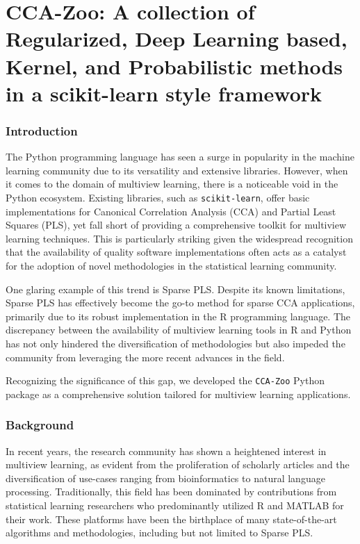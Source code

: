 \chapter{CCA-Zoo: A collection of Regularized, Deep Learning based, Kernel, and Probabilistic methods in a scikit-learn style framework}\label{sec:ccazoo}

\subsection{Introduction}

The Python programming language has seen a surge in popularity in the machine learning community due to its versatility and extensive libraries. However, when it comes to the domain of multiview learning, there is a noticeable void in the Python ecosystem. Existing libraries, such as \texttt{scikit-learn}\cite{pedregosa2011scikit}, offer basic implementations for Canonical Correlation Analysis (CCA) and Partial Least Squares (PLS), yet fall short of providing a comprehensive toolkit for multiview learning techniques. This is particularly striking given the widespread recognition that the availability of quality software implementations often acts as a catalyst for the adoption of novel methodologies in the statistical learning community.

One glaring example of this trend is Sparse PLS. Despite its known limitations, Sparse PLS has effectively become the go-to method for sparse CCA applications, primarily due to its robust implementation in the R programming language. The discrepancy between the availability of multiview learning tools in R and Python has not only hindered the diversification of methodologies but also impeded the community from leveraging the more recent advances in the field.

Recognizing the significance of this gap, we developed the \texttt{CCA-Zoo} Python package as a comprehensive solution tailored for multiview learning applications.

\subsection{Background}

In recent years, the research community has shown a heightened interest in multiview learning, as evident from the proliferation of scholarly articles and the diversification of use-cases ranging from bioinformatics to natural language processing.
Traditionally, this field has been dominated by contributions from statistical learning researchers who predominantly utilized R and MATLAB for their work.
These platforms have been the birthplace of many state-of-the-art algorithms and methodologies, including but not limited to Sparse PLS.

